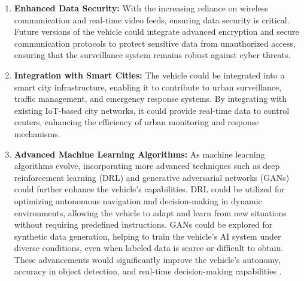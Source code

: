 \documentclass[12pt,a4paper]{report}
\begin{document}
\begin{enumerate}
\item \textbf{Enhanced Data Security:} 
With the increasing reliance on wireless communication and real-time video feeds, ensuring data security is critical. Future versions of the vehicle could integrate advanced encryption and secure communication protocols to protect sensitive data from unauthorized access, ensuring that the surveillance system remains robust against cyber threats.

\item \textbf{Integration with Smart Cities:} 
The vehicle could be integrated into a smart city infrastructure, enabling it to contribute to urban surveillance, traffic management, and emergency response systems. By integrating with existing IoT-based city networks, it could provide real-time data to control centers, enhancing the efficiency of urban monitoring and response mechanisms.

\item \textbf{Advanced Machine Learning Algorithms:} 
As machine learning algorithms evolve, incorporating more advanced techniques such as deep reinforcement learning (DRL) and generative adversarial networks (GANs) could further enhance the vehicle's capabilities. DRL could be utilized for optimizing autonomous navigation and decision-making in dynamic environments, allowing the vehicle to adapt and learn from new situations without requiring predefined instructions. GANs could be explored for synthetic data generation, helping to train the vehicle’s AI system under diverse conditions, even when labeled data is scarce or difficult to obtain. These advancements would significantly improve the vehicle’s autonomy, accuracy in object detection, and real-time decision-making capabilities \cite{deepRL, gan}.



\end{enumerate}







	\newpage




 

	
\end{document}
